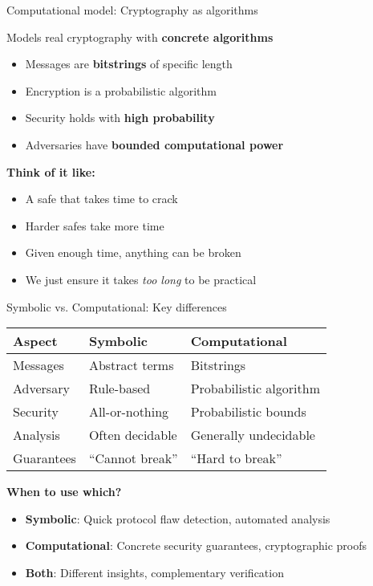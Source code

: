 \documentclass[aspectratio=169, lualatex, handout]{beamer}
\begin{document}
\begin{frame}{Computational model: Cryptography as algorithms}
	\begin{center}
		\Large
		Models real cryptography with \textbf{concrete algorithms}
	\end{center}
	\vspace{1em}
	\begin{itemize}
		\item Messages are \textbf{bitstrings} of specific length
		\item Encryption is a probabilistic algorithm
		\item Security holds with \textbf{high probability}
		\item Adversaries have \textbf{bounded computational power}
	\end{itemize}
	\vspace{0.5em}
	\textbf{Think of it like:}
	\begin{itemize}
		\item A safe that takes time to crack
		\item Harder safes take more time
		\item Given enough time, anything can be broken
		\item We just ensure it takes \textit{too long} to be practical
	\end{itemize}
\end{frame}

\begin{frame}{Symbolic vs. Computational: Key differences}
	\begin{center}
		\begin{tabular}{|l|l|l|}
			\hline
			\textbf{Aspect} & \textbf{Symbolic} & \textbf{Computational}  \\
			\hline
			Messages        & Abstract terms    & Bitstrings              \\
			\hline
			Adversary       & Rule-based        & Probabilistic algorithm \\
			\hline
			Security        & All-or-nothing    & Probabilistic bounds    \\
			\hline
			Analysis        & Often decidable   & Generally undecidable   \\
			\hline
			Guarantees      & ``Cannot break''  & ``Hard to break''       \\
			\hline
		\end{tabular}
	\end{center}
	\vspace{1em}
	\textbf{When to use which?}
	\begin{itemize}
		\item \textbf{Symbolic}: Quick protocol flaw detection, automated analysis
		\item \textbf{Computational}: Concrete security guarantees, cryptographic proofs
		\item \textbf{Both}: Different insights, complementary verification
	\end{itemize}
\end{frame}
\end{document}

